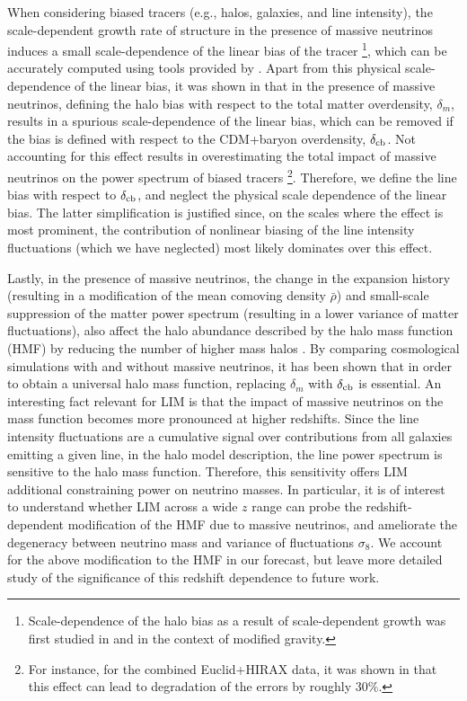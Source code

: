 \documentclass[twocolumn]{aastex631}
\begin{document}
When considering biased tracers (e.g., halos, galaxies, and line intensity), the scale-dependent growth rate of structure in the presence of massive neutrinos induces a small scale-dependence of the linear bias of the tracer \citep{LoVerde:2014pxa}\footnote{Scale-dependence of the halo bias as a result of scale-dependent growth was first studied in \cite{Hui:2007zh} and \cite{Parfrey:2010uy} in the context of modified gravity.}, which can be accurately computed using tools provided by  \cite{Munoz:2018ajr,Valcin:2019fxe}. Apart from this physical scale-dependence of the linear bias, it was shown in \cite{Villaescusa-Navarro:2013pva, Castorina:2013wga} that in the presence of massive neutrinos, defining the halo bias with respect to the total matter overdensity, $\delta_m$, results in a spurious scale-dependence of the linear bias, which can be removed if the bias is defined with respect to the CDM+baryon overdensity, $\delta_{\rm cb}$. Not accounting for this effect results in overestimating the total impact of massive neutrinos on the power spectrum of biased tracers \citep{Obuljen:2017jiy}\footnote{For instance, for the combined Euclid+HIRAX data, it was shown in \cite{Obuljen:2017jiy} that this effect can lead to degradation of the errors by roughly $30\%$.}. Therefore, we define the line bias with respect to $\delta_{\rm cb}$, and neglect the physical scale dependence of the linear bias. The latter simplification is justified since, on the scales where the effect is most prominent, the contribution of nonlinear biasing of the line intensity fluctuations (which we have neglected) most likely dominates over this effect. 

Lastly, in the presence of massive neutrinos, the change in the expansion history (resulting in a modification of the mean comoving density $\bar \rho$) and small-scale suppression of the matter power spectrum (resulting in a lower variance of matter fluctuations), also affect the halo abundance described by the halo mass function (HMF) by reducing the number of higher mass halos \citep{Castorina:2013wga, Biswas:2019uhy}. By comparing cosmological simulations with and without massive neutrinos, it has been shown that in order to obtain a universal halo mass function, replacing $\delta_m$ with $\delta_{\rm cb}$ is essential. An interesting fact relevant for LIM is that the impact of massive neutrinos on the mass function becomes more pronounced at higher redshifts. Since the line intensity fluctuations are a cumulative signal over contributions from all galaxies emitting a given line, in the halo model description, the line power spectrum is sensitive to the halo mass function. Therefore, this sensitivity offers LIM additional constraining power on neutrino masses. In particular, it is of interest to understand whether LIM across a wide $z$ range can probe the redshift-dependent modification of the HMF due to massive neutrinos, and ameliorate the degeneracy between neutrino mass and variance of fluctuations $\sigma_8$. We account for the above modification to the HMF in our forecast, but leave more detailed study of the significance of this redshift dependence to future work.
\end{document}
